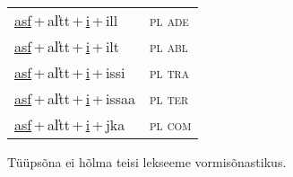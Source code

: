 \begin{minipage}{\textwidth}
\begin{sideways}
\begin{tabular}{l l}
\underline{asf}\,+\,al̕tt\,+\,\underline{i}\,+\,ill & \textsc{ pl ade } \\
\underline{asf}\,+\,al̕tt\,+\,\underline{i}\,+\,ilt & \textsc{ pl abl } \\
\underline{asf}\,+\,al̕tt\,+\,\underline{i}\,+\,issi & \textsc{ pl tra } \\
\underline{asf}\,+\,al̕tt\,+\,\underline{i}\,+\,issaa & \textsc{ pl ter } \\
\underline{asf}\,+\,al̕tt\,+\,\underline{i}\,+\,jka & \textsc{ pl com } \\
\end{tabular}
\end{sideways}
\label{tab:tüüpsõnamall-asfi}

\end{minipage}

 
\vspace{1em}
\noindent Tüüpsõna ei hõlma teisi lekseeme vormi\-sõnastikus.
